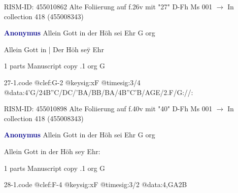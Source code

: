 \documentclass[twocolumn]{book}
\begin{document}
\newline RISM-ID: 455010862
\newline Alte Foliierung auf f.26v mit "27"
\newline D-Fh  Ms 001
\newline $\rightarrow$ In collection 418 (455008343)

\newline \par \vspace{7pt} \textcolor{darkblue}{\textbf{Anonymus  }}
\newline Allein Gott in der Höh sei Ehr  G  
\newline org
\newline \begin{itshape}[f.40v, at left:] Allein Gott in | Der Höh seÿ Ehr\end{itshape} 
\newline \textcolor{darkblue}{}  1 parts  
\newline Manuscript copy
.1  org  G  
\begin{filecontents*}{27-1.code}
@clef:G-2
@keysig:xF
@timesig:3/4
@data:4'G/24B''C/DC/'BA/BB/BA/4B''C'B/AGE/2.F/G://:
\end{filecontents*}
\newline
%

\newline RISM-ID: 455010898
\newline Alte Foliierung auf f.40v mit "40"
\newline D-Fh  Ms 001
\newline $\rightarrow$ In collection 418 (455008343)

\newline \par \vspace{7pt} \textcolor{darkblue}{\textbf{Anonymus  }}
\newline Allein Gott in der Höh sei Ehr  G  
\newline org
\newline \begin{itshape}[f.106v, heading:] Allein Gott in der Höh sey Ehr:\end{itshape} 
\newline \textcolor{darkblue}{}  1 parts  
\newline Manuscript copy
.1  org  G  
\begin{filecontents*}{28-1.code}
@clef:F-4
@keysig:xF
@timesig:3/2
@data:4,GA2B%
\end{filecontents*}
\newline
%
\end{document}

